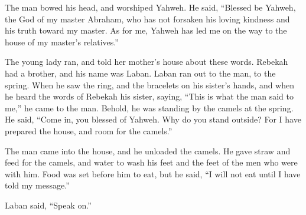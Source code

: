  The man bowed his head, and worshiped Yahweh.
 He said, ``Blessed be Yahweh, the God of my master
Abraham, who has not forsaken his loving kindness and his truth toward
my master. As for me, Yahweh has led me on the way to the house of my
master's relatives.''

 The young lady ran, and told her mother's house about
these words.  Rebekah had a brother, and his name was
Laban. Laban ran out to the man, to the spring.  When he
saw the ring, and the bracelets on his sister's hands, and when he heard
the words of Rebekah his sister, saying, ``This is what the man said to
me,'' he came to the man. Behold, he was standing by the camels at the
spring.  He said, ``Come in, you blessed of Yahweh. Why do
you stand outside? For I have prepared the house, and room for the
camels.''

 The man came into the house, and he unloaded the camels.
He gave straw and feed for the camels, and water to wash his feet and
the feet of the men who were with him.  Food was set before
him to eat, but he said, ``I will not eat until I have told my
message.''

Laban said, ``Speak on.''

